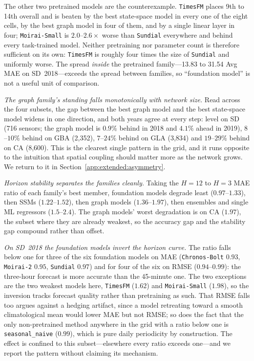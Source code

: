 The other two pretrained models are the counterexample. \texttt{TimesFM} places
9th to 14th overall and is beaten by the best state-space model in every one of
the eight cells, by the best graph model in four of them, and by a single
linear layer in four; \texttt{Moirai-Small} is $2.0$--$2.6\times$ worse
than \texttt{Sundial} everywhere and behind every task-trained model. Neither
pretraining nor parameter count is therefore sufficient on its own:
\texttt{TimesFM} is roughly four times the size of \texttt{Sundial} and
uniformly worse. The spread \emph{inside} the pretrained family---13.83 to 31.54
Avg MAE on SD~2018---exceeds the spread between families, so ``foundation
model'' is not a useful unit of comparison.

\textit{The graph family's standing falls monotonically with network size.}
Read across the four subsets, the gap between the best graph model and the best
state-space model widens in one direction, and both years agree at every step:
level on SD (716 sensors; the graph model is $0.9\%$ behind in 2018 and $4.1\%$
ahead in 2019), $8$--$10\%$ behind on GBA (2,352), $7$--$24\%$ behind on GLA
(3,834) and $19$--$29\%$ behind on CA (8,600). This is the clearest single
pattern in the grid, and it runs opposite to the intuition that spatial coupling
should matter more as the network grows. We return to it in Section~\ref{app:extended:asymmetry}.

\textit{Horizon stability separates the families cleanly.} Taking the $H{=}12$
to $H{=}3$ MAE ratio of each family's best member, foundation models degrade
least ($0.97$--$1.33$), then SSMs ($1.22$--$1.52$), then graph models
($1.36$--$1.97$), then ensembles and single ML regressors ($1.5$--$2.4$). The
graph models' worst degradation is on CA ($1.97$), the subset where they are
already weakest, so the accuracy gap and the stability gap compound rather than
offset.

\textit{On SD~2018 the foundation models invert the horizon curve.} The ratio
falls below one for three of the six foundation models on MAE
(\texttt{Chronos-Bolt} $0.93$, \texttt{Moirai-2} $0.95$, \texttt{Sundial}
$0.97$) and for four of the six on RMSE ($0.94$--$0.99$): the three-hour
forecast is more accurate than the 45-minute one. The two exceptions are the two
weakest models here, \texttt{TimesFM} ($1.62$) and \texttt{Moirai-Small}
($1.98$), so the inversion tracks forecast quality rather than pretraining as
such. That RMSE falls too argues
against a hedging artifact, since a model retreating toward a smooth
climatological mean would lower MAE but not RMSE; so does the fact that the only
non-pretrained method anywhere in the grid with a ratio below one is
\texttt{seasonal\_naive} ($0.99$), which is pure daily periodicity by
construction. The effect is confined to this subset---elsewhere every ratio
exceeds one---and we report the pattern without claiming its mechanism.

